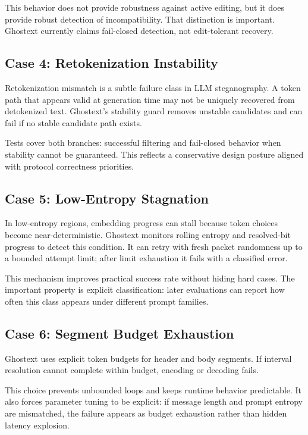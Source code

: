 This behavior does not provide robustness against active editing, but it does provide robust detection of incompatibility. That distinction is important. Ghostext currently claims fail-closed detection, not edit-tolerant recovery.

\subsection{Case 4: Retokenization Instability}

Retokenization mismatch is a subtle failure class in LLM steganography. A token path that appears valid at generation time may not be uniquely recovered from detokenized text. Ghostext's stability guard removes unstable candidates and can fail if no stable candidate path exists.

Tests cover both branches: successful filtering and fail-closed behavior when stability cannot be guaranteed. This reflects a conservative design posture aligned with protocol correctness priorities.

\subsection{Case 5: Low-Entropy Stagnation}

In low-entropy regions, embedding progress can stall because token choices become near-deterministic. Ghostext monitors rolling entropy and resolved-bit progress to detect this condition. It can retry with fresh packet randomness up to a bounded attempt limit; after limit exhaustion it fails with a classified error.

This mechanism improves practical success rate without hiding hard cases. The important property is explicit classification: later evaluations can report how often this class appears under different prompt families.

\subsection{Case 6: Segment Budget Exhaustion}

Ghostext uses explicit token budgets for header and body segments. If interval resolution cannot complete within budget, encoding or decoding fails.

This choice prevents unbounded loops and keeps runtime behavior predictable. It also forces parameter tuning to be explicit: if message length and prompt entropy are mismatched, the failure appears as budget exhaustion rather than hidden latency explosion.

